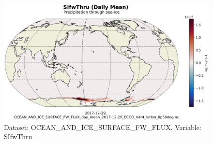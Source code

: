 \begin{figure}[H]
\centering
\includegraphics[scale=0.55]{../images/plots/latlon_plots/Ocean_and_Sea-Ice_Surface_Freshwater_Fluxes/SIfwThru.png}
\caption{Dataset: OCEAN\_AND\_ICE\_SURFACE\_FW\_FLUX, Variable: SIfwThru}
\label{tab:table-OCEAN_AND_ICE_SURFACE_FW_FLUX_SIfwThru-Plot}
\end{figure}
\pagebreak
